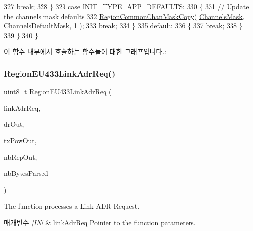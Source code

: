 \begin{DoxyCode}
327             \textcolor{keywordflow}{break};
328         \}
329         \textcolor{keywordflow}{case} \mbox{\hyperlink{group___r_e_g_i_o_n_gga11ecad794560a3d3961bdf1c9a27d3b2a3d260b94611dd833c5243c16ca26c3f0}{INIT\_TYPE\_APP\_DEFAULTS}}:
330         \{
331             \textcolor{comment}{// Update the channels mask defaults}
332             \mbox{\hyperlink{group___r_e_g_i_o_n_c_o_m_m_o_n_ga95f5199d490113269fae7f2e0569e9a0}{RegionCommonChanMaskCopy}}( \mbox{\hyperlink{_region_e_u433_8c_a2188957b5ca6af8092154d7ccbfa5757}{ChannelsMask}}, 
      \mbox{\hyperlink{_region_e_u433_8c_ac127b19779301713d5ed92eb03366a2d}{ChannelsDefaultMask}}, 1 );
333             \textcolor{keywordflow}{break};
334         \}
335         \textcolor{keywordflow}{default}:
336         \{
337             \textcolor{keywordflow}{break};
338         \}
339     \}
340 \}
\end{DoxyCode}
이 함수 내부에서 호출하는 함수들에 대한 그래프입니다.\+:
\mbox{\label{group___r_e_g_i_o_n_e_u433_gafd3e374d9048e67d54d1fa90b8d18723}} 
\subsubsection{\texorpdfstring{Region\+E\+U433\+Link\+Adr\+Req()}{RegionEU433LinkAdrReq()}}
{\footnotesize\ttfamily uint8\+\_\+t Region\+E\+U433\+Link\+Adr\+Req (\begin{DoxyParamCaption}\item[{\mbox{\hyperlink{group___r_e_g_i_o_n_gad4af503e8d4de1846129e26a799a1e8e}{Link\+Adr\+Req\+Params\+\_\+t}} $\ast$}]{link\+Adr\+Req,  }\item[{int8\+\_\+t $\ast$}]{dr\+Out,  }\item[{int8\+\_\+t $\ast$}]{tx\+Pow\+Out,  }\item[{uint8\+\_\+t $\ast$}]{nb\+Rep\+Out,  }\item[{uint8\+\_\+t $\ast$}]{nb\+Bytes\+Parsed }\end{DoxyParamCaption})}



The function processes a Link A\+DR Request. 


\begin{DoxyParams}{매개변수}
{\em \mbox{[}\+I\+N\mbox{]}} & link\+Adr\+Req Pointer to the function parameters.\\
\hline
\end{DoxyParams}

